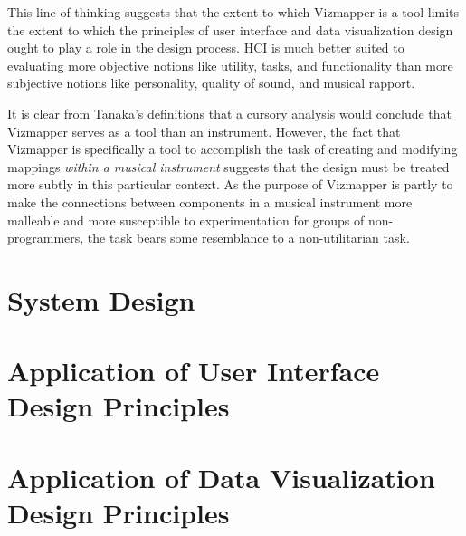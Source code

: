 This line of thinking suggests that the extent to which Vizmapper is a tool limits the extent to which the principles of user interface and data visualization design ought to play a role in the design process. HCI is much better suited to evaluating more objective notions like utility, tasks, and functionality than more subjective notions like personality, quality of sound, and musical rapport.

It is clear from Tanaka's definitions that a cursory analysis would conclude that Vizmapper serves as a tool than an instrument. However, the fact that Vizmapper is specifically a tool to accomplish the task of creating and modifying mappings \emph{within a musical instrument} suggests that the design must be treated more subtly in this particular context. As the purpose of Vizmapper is partly to make the connections between components in a musical instrument more malleable and more susceptible to experimentation for groups of non-programmers, the task bears some resemblance to a non-utilitarian task.



\section{System Design}

\section{Application of User Interface Design Principles}

\section{Application of Data Visualization Design Principles}

